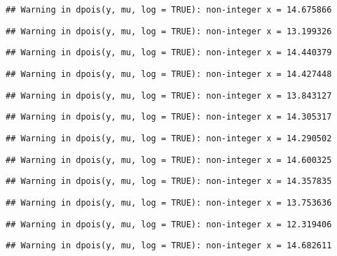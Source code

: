 \documentclass[
]{article}
\begin{document}
\begin{verbatim}
## Warning in dpois(y, mu, log = TRUE): non-integer x = 14.675866
\end{verbatim}

\begin{verbatim}
## Warning in dpois(y, mu, log = TRUE): non-integer x = 13.199326
\end{verbatim}

\begin{verbatim}
## Warning in dpois(y, mu, log = TRUE): non-integer x = 14.440379
\end{verbatim}

\begin{verbatim}
## Warning in dpois(y, mu, log = TRUE): non-integer x = 14.427448
\end{verbatim}

\begin{verbatim}
## Warning in dpois(y, mu, log = TRUE): non-integer x = 13.843127
\end{verbatim}

\begin{verbatim}
## Warning in dpois(y, mu, log = TRUE): non-integer x = 14.305317
\end{verbatim}

\begin{verbatim}
## Warning in dpois(y, mu, log = TRUE): non-integer x = 14.290502
\end{verbatim}

\begin{verbatim}
## Warning in dpois(y, mu, log = TRUE): non-integer x = 14.600325
\end{verbatim}

\begin{verbatim}
## Warning in dpois(y, mu, log = TRUE): non-integer x = 14.357835
\end{verbatim}

\begin{verbatim}
## Warning in dpois(y, mu, log = TRUE): non-integer x = 13.753636
\end{verbatim}

\begin{verbatim}
## Warning in dpois(y, mu, log = TRUE): non-integer x = 12.319406
\end{verbatim}

\begin{verbatim}
## Warning in dpois(y, mu, log = TRUE): non-integer x = 14.682611
\end{verbatim}
\end{document}
